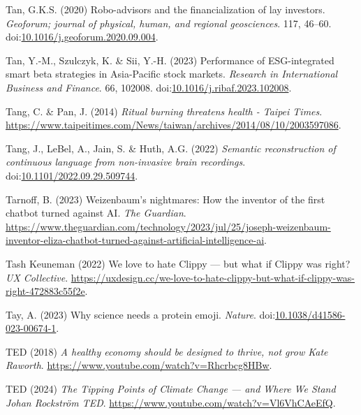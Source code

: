 \documentclass[
  letterpaper,
  DIV=11,
  numbers=noendperiod]{scrartcl}
\newlength{\cslhangindent}
\newenvironment{CSLReferences}[2] %
 {\begin{list}{}{%
  \setlength{\itemindent}{0pt}
  \setlength{\leftmargin}{0pt}
  \setlength{\parsep}{0pt}
  \ifodd #1
   \setlength{\leftmargin}{\cslhangindent}
   \setlength{\itemindent}{-1\cslhangindent}
  \fi
  \setlength{\itemsep}{#2\baselineskip}}}
 {\end{list}}
\begin{document}
\begin{CSLReferences}{0}{1}
Tan, G.K.S. (2020) Robo-advisors and the financialization of lay
investors. \emph{Geoforum; journal of physical, human, and regional
geosciences}. 117, 46--60.
doi:\href{https://doi.org/10.1016/j.geoforum.2020.09.004}{10.1016/j.geoforum.2020.09.004}.

Tan, Y.-M., Szulczyk, K. \& Sii, Y.-H. (2023) Performance of
{ESG-integrated} smart beta strategies in {Asia-Pacific} stock markets.
\emph{Research in International Business and Finance}. 66, 102008.
doi:\href{https://doi.org/10.1016/j.ribaf.2023.102008}{10.1016/j.ribaf.2023.102008}.

Tang, C. \& Pan, J. (2014) \emph{Ritual burning threatens health -
{Taipei Times}}.
\url{https://www.taipeitimes.com/News/taiwan/archives/2014/08/10/2003597086}.

Tang, J., LeBel, A., Jain, S. \& Huth, A.G. (2022) \emph{Semantic
reconstruction of continuous language from non-invasive brain
recordings}.
doi:\href{https://doi.org/10.1101/2022.09.29.509744}{10.1101/2022.09.29.509744}.

Tarnoff, B. (2023) Weizenbaum's nightmares: How the inventor of the
first chatbot turned against {AI}. \emph{The Guardian}.
\url{https://www.theguardian.com/technology/2023/jul/25/joseph-weizenbaum-inventor-eliza-chatbot-turned-against-artificial-intelligence-ai}.

Tash Keuneman (2022) We love to hate {Clippy} --- but what if {Clippy}
was right? \emph{UX Collective}.
\url{https://uxdesign.cc/we-love-to-hate-clippy-but-what-if-clippy-was-right-472883c55f2e}.

Tay, A. (2023) Why science needs a protein emoji. \emph{Nature}.
doi:\href{https://doi.org/10.1038/d41586-023-00674-1}{10.1038/d41586-023-00674-1}.

TED (2018) \emph{A healthy economy should be designed to thrive, not
grow {\textbar} {Kate Raworth}}.
\url{https://www.youtube.com/watch?v=Rhcrbcg8HBw}.

TED (2024) \emph{The {Tipping Points} of {Climate Change} --- and {Where
We Stand} {\textbar} {Johan Rockstr{ö}m} {\textbar} {TED}}.
\url{https://www.youtube.com/watch?v=Vl6VhCAeEfQ}.


\end{CSLReferences}
\end{document}
